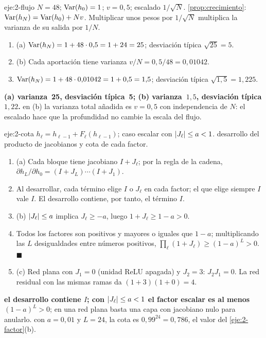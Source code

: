 \begin{solucion}{eje:2-flujo}
\datos $N=48$; $\operatorname{Var}(h_0)=1$; $v=0{,}5$; escalado $1/\sqrt N$.
\planteamiento \cref{prop:crecimiento}: $\operatorname{Var}(h_N)=\operatorname{Var}(h_0)+Nv$. Multiplicar unos pesos por $1/\sqrt N$ multiplica la varianza de su salida por $1/N$.
\pasos
\begin{enumerate}[label=\arabic*.]
  \item (a) $\operatorname{Var}(h_N)=1+48\cdot 0{,}5=1+24=25$; desviación típica $\sqrt{25}=5$.
  \item (b) Cada aportación tiene varianza $v/N=0{,}5/48=0{,}01042$.
  \item $\operatorname{Var}(h_N)=1+48\cdot 0{,}01042=1+0{,}5=1{,}5$; desviación típica $\sqrt{1{,}5}=1{,}225$.
\end{enumerate}
\resultado \textbf{(a) varianza~25, desviación típica~5; (b) varianza~$1{,}5$, desviación típica $1{,}22$.}
\comprobacion en (b) la varianza total añadida es $v=0{,}5$ con independencia de $N$: el escalado hace que la profundidad no cambie la escala del flujo.
\end{solucion}

\begin{solucion}{eje:2-cota}
\datos $h_\ell=h_{\ell-1}+F_\ell(h_{\ell-1})$; caso escalar con $\lvert J_\ell\rvert\le a<1$.
\planteamiento desarrollo del producto de jacobianos y cota de cada factor.
\pasos
\begin{enumerate}[label=\arabic*.]
  \item (a) Cada bloque tiene jacobiano $I+J_\ell$; por la regla de la cadena, $\partial h_L/\partial h_0=(I+J_L)\cdots(I+J_1)$.
  \item Al desarrollar, cada término elige $I$ o $J_\ell$ en cada factor; el que elige siempre $I$ vale $I$. El desarrollo contiene, por tanto, el término $I$.
  \item (b) $\lvert J_\ell\rvert\le a$ implica $J_\ell\ge -a$, luego $1+J_\ell\ge 1-a>0$.
  \item Todos los factores son positivos y mayores o iguales que $1-a$; multiplicando las $L$ desigualdades entre números positivos, $\prod_\ell(1+J_\ell)\ge(1-a)^{L}>0$. $\blacksquare$
  \item (c) Red plana con $J_1=0$ (unidad ReLU apagada) y $J_2=3$: $J_2J_1=0$. La red residual con las mismas ramas da $(1+3)(1+0)=4$.
\end{enumerate}
\resultado \textbf{el desarrollo contiene $I$; con $\lvert J_\ell\rvert\le a<1$ el factor escalar es al menos $(1-a)^{L}>0$}; en una red plana basta una capa con jacobiano nulo para anularlo.
\comprobacion con $a=0{,}01$ y $L=24$, la cota es $0{,}99^{24}=0{,}786$, el valor del \cref{eje:2-factor}(b).
\end{solucion}

